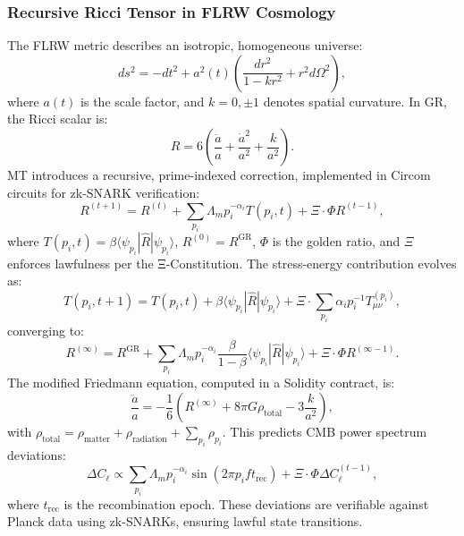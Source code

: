\documentclass{article}
\theoremstyle{plain}
\begin{document}
\subsubsection{Recursive Ricci Tensor in FLRW Cosmology}
The FLRW metric describes an isotropic, homogeneous universe:
\begin{equation}
ds^2 = -dt^2 + a^2(t) \left( \frac{dr^2}{1 - k r^2} + r^2 d\Omega^2 \right),
\end{equation}
where \( a(t) \) is the scale factor, and \( k = 0, \pm 1 \) denotes spatial curvature. In GR, the Ricci scalar is:
\begin{equation}
R = 6 \left( \frac{\ddot{a}}{a} + \frac{\dot{a}^2}{a^2} + \frac{k}{a^2} \right).
\end{equation}
MT introduces a recursive, prime-indexed correction, implemented in Circom circuits for zk-SNARK verification:
\begin{equation}
R^{(t+1)} = R^{(t)} + \sum_{p_i} \Lambda_m p_i^{-\alpha_i} T(p_i, t) + \Xi \cdot \Phi R^{(t-1)},
\end{equation}
where \( T(p_i, t) = \beta \langle \psi_{p_i} | \hat{R} | \psi_{p_i} \rangle \), \( R^{(0)} = R^{\text{GR}} \), \(\Phi\) is the golden ratio, and \(\Xi\) enforces lawfulness per the Ξ-Constitution. The stress-energy contribution evolves as:
\begin{equation}
T(p_i, t+1) = T(p_i, t) + \beta \langle \psi_{p_i} | \hat{R} | \psi_{p_i} \rangle + \Xi \cdot \sum_{p_i} \alpha_i p_i^{-1} T_{\mu\nu}^{(p_i)},
\end{equation}
converging to:
\begin{equation}
R^{(\infty)} = R^{\text{GR}} + \sum_{p_i} \Lambda_m p_i^{-\alpha_i} \frac{\beta}{1 - \beta} \langle \psi_{p_i} | \hat{R} | \psi_{p_i} \rangle + \Xi \cdot \Phi R^{(\infty-1)}.
\end{equation}
The modified Friedmann equation, computed in a Solidity contract, is:
\begin{equation}
\frac{\ddot{a}}{a} = -\frac{1}{6} \left( R^{(\infty)} + 8 \pi G \rho_{\text{total}} - 3 \frac{k}{a^2} \right),
\end{equation}
with \( \rho_{\text{total}} = \rho_{\text{matter}} + \rho_{\text{radiation}} + \sum_{p_i} \rho_{p_i} \). This predicts CMB power spectrum deviations:
\begin{equation}
\Delta C_\ell \propto \sum_{p_i} \Lambda_m p_i^{-\alpha_i} \sin(2 \pi p_i f t_{\text{rec}}) + \Xi \cdot \Phi \Delta C_\ell^{(t-1)},
\end{equation}
where \( t_{\text{rec}} \) is the recombination epoch. These deviations are verifiable against Planck data using zk-SNARKs, ensuring lawful state transitions.
\end{document}
